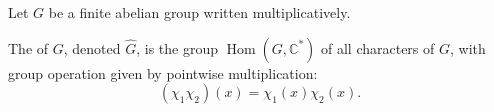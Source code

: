 Let $G$ be a finite abelian group written multiplicatively.

The  of $G$, denoted $\widehat{G}$, is the group $\operatorname{Hom}(G, \mathbb{C}^*)$ of all characters of $G$, with group operation given by pointwise multiplication:
$$(\chi_1 \chi_2)(x) = \chi_1(x) \chi_2(x).$$
